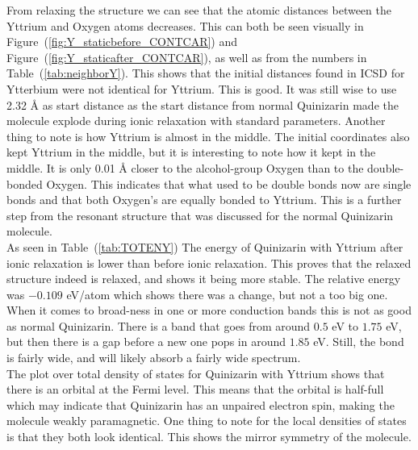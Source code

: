 \documentclass{article}
\begin{document}
    From relaxing the structure we can see that the atomic distances between the Yttrium and Oxygen atoms decreases. This can both be seen visually in Figure~(\ref{fig:Y_staticbefore_CONTCAR}) and Figure~(\ref{fig:Y_staticafter_CONTCAR}), as well as from the numbers in Table~(\ref{tab:neighborY}). This shows that the initial distances found in ICSD for Ytterbium were not identical for Yttrium. This is good. It was still wise to use 2.32 Å as start distance as the start distance from normal Quinizarin made the molecule explode during ionic relaxation with standard parameters. Another thing to note is how Yttrium is almost in the middle. The initial coordinates also kept Yttrium in the middle, but it is interesting to note how it kept in the middle. It is only 0.01 Å closer to the alcohol-group Oxygen than to the double-bonded Oxygen. This indicates that what used to be double bonds now are single bonds and that both Oxygen's are equally bonded to Yttrium. This is a further step from the resonant structure that was discussed for the normal Quinizarin molecule. \\

    As seen in Table~(\ref{tab:TOTENY}) The energy of Quinizarin with Yttrium after ionic relaxation is lower than before ionic relaxation. This proves that the relaxed structure indeed is relaxed, and shows it being more stable. The relative energy was $-0.109$ eV/atom which shows there was a change, but not a too big one. When it comes to broad-ness in one or more conduction bands this is not as good as normal Quinizarin. There is a band that goes from around $0.5$ eV  to $1.75$ eV, but then there is a gap before a new one pops in around $1.85$ eV. Still, the bond is fairly wide, and will likely absorb a fairly wide spectrum. \\

    The plot over total density of states for Quinizarin with Yttrium shows that there is an orbital at the Fermi level. This means that the orbital is half-full which may indicate that Quinizarin has an unpaired electron spin, making the molecule weakly paramagnetic. One thing to note for the local densities of states is that they both look identical. This shows the mirror symmetry of the molecule. \\
\end{document}
